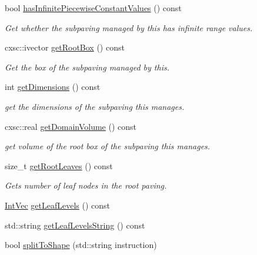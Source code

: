 \begin{DoxyCompactItemize}
bool \hyperlink{classsubpavings_1_1PiecewiseConstantFunction_a06b96fb88f394c3b65af65e6eff44e7a}{has\-Infinite\-Piecewise\-Constant\-Values} () const 
\begin{DoxyCompactList}\small\item\em \-Get whether the subpaving managed by this has infinite range values. \end{DoxyCompactList}\item 
cxsc\-::ivector \hyperlink{classsubpavings_1_1PiecewiseConstantFunction_a2ca8259389efd2797732caeeab988b3d}{get\-Root\-Box} () const 
\begin{DoxyCompactList}\small\item\em \-Get the box of the subpaving managed by this. \end{DoxyCompactList}\item 
int \hyperlink{classsubpavings_1_1PiecewiseConstantFunction_a08cecaf3025aeeeea90b26acbe87ce24}{get\-Dimensions} () const 
\begin{DoxyCompactList}\small\item\em get the dimensions of the subpaving this manages. \end{DoxyCompactList}\item 
cxsc\-::real \hyperlink{classsubpavings_1_1PiecewiseConstantFunction_a2bc216ff479f7edc61e1ef8619c27214}{get\-Domain\-Volume} () const 
\begin{DoxyCompactList}\small\item\em get volume of the root box of the subpaving this manages. \end{DoxyCompactList}\item 
size\-\_\-t \hyperlink{classsubpavings_1_1PiecewiseConstantFunction_a938b27618e6805bc57e70ab8f0e6280d}{get\-Root\-Leaves} () const 
\begin{DoxyCompactList}\small\item\em \-Gets number of leaf nodes in the root paving. \end{DoxyCompactList}\item 
\hyperlink{namespacesubpavings_aed8e75b2af342b9c1460431c223dca8e}{\-Int\-Vec} \hyperlink{classsubpavings_1_1PiecewiseConstantFunction_aad0a7c30389235a8fa0a36fc0a1d2c7a}{get\-Leaf\-Levels} () const 
\item 
std\-::string \hyperlink{classsubpavings_1_1PiecewiseConstantFunction_aa27d2f72b0d1edcddd73929a69b44dfb}{get\-Leaf\-Levels\-String} () const 
\item 
bool \hyperlink{classsubpavings_1_1PiecewiseConstantFunction_a6d0382e5493bd90cb80a823e567cab4f}{split\-To\-Shape} (std\-::string instruction)

\end{DoxyCompactItemize}
